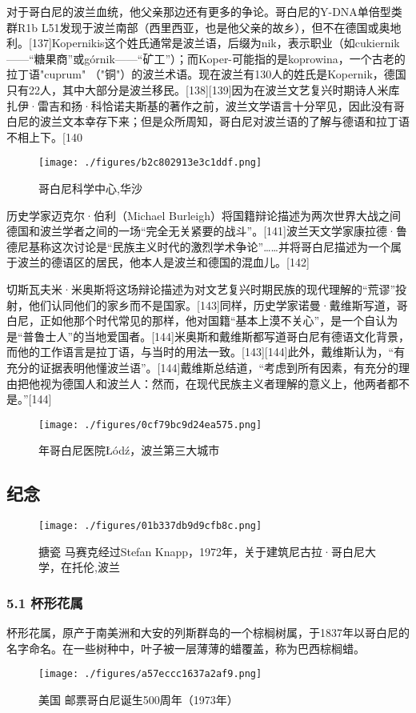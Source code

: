 对于哥白尼的波兰血统，他父亲那边还有更多的争论。哥白尼的Y-DNA单倍型类群R1b L51发现于波兰南部（西里西亚，也是他父亲的故乡），但不在德国或奥地利。[137]Kopernikis这个姓氏通常是波兰语，后缀为nik，表示职业（如cukiernik——“糖果商”或górnik——“矿工”）；而Koper-可能指的是koprowina，一个古老的拉丁语"cuprum" （"铜"）的波兰术语。现在波兰有130人的姓氏是Kopernik，德国只有22人，其中大部分是波兰移民。[138][139]因为在波兰文艺复兴时期诗人米库扎伊·雷吉和扬·科恰诺夫斯基的著作之前，波兰文学语言十分罕见，因此没有哥白尼的波兰文本幸存下来；但是众所周知，哥白尼对波兰语的了解与德语和拉丁语不相上下。[140
\begin{figure}[ht]
\centering
\texttt{[image: ./figures/b2c802913e3c1ddf.png]}
\caption{哥白尼科学中心,华沙} \label{fig_GBN_31}
\end{figure}
历史学家迈克尔·伯利（Michael Burleigh）将国籍辩论描述为两次世界大战之间德国和波兰学者之间的一场“完全无关紧要的战斗”。[141]波兰天文学家康拉德·鲁德尼基称这次讨论是“民族主义时代的激烈学术争论”……并将哥白尼描述为一个属于波兰的德语区的居民，他本人是波兰和德国的混血儿。[142]

切斯瓦夫米·米奥斯将这场辩论描述为对文艺复兴时期民族的现代理解的“荒谬”投射，他们认同他们的家乡而不是国家。[143]同样，历史学家诺曼·戴维斯写道，哥白尼，正如他那个时代常见的那样，他对国籍“基本上漠不关心”，是一个自认为是“普鲁士人”的当地爱国者。[144]米奥斯和戴维斯都写道哥白尼有德语文化背景，而他的工作语言是拉丁语，与当时的用法一致。[143][144]此外，戴维斯认为，“有充分的证据表明他懂波兰语”。[144]戴维斯总结道，“考虑到所有因素，有充分的理由把他视为德国人和波兰人：然而，在现代民族主义者理解的意义上，他两者都不是。”[144]
\begin{figure}[ht]
\centering
\texttt{[image: ./figures/0cf79bc9d24ea575.png]}
\caption{年哥白尼医院Łódź，波兰第三大城市} \label{fig_GBN_32}
\end{figure}

\subsection{纪念}
\begin{figure}[ht]
\centering
\texttt{[image: ./figures/01b337db9d9cfb8c.png]}
\caption{搪瓷 马赛克经过Stefan Knapp，1972年，关于建筑尼古拉·哥白尼大学，在托伦,波兰} \label{fig_GBN_34}
\end{figure}

\subsubsection{5.1 杯形花属}
杯形花属，原产于南美洲和大安的列斯群岛的一个棕榈树属，于1837年以哥白尼的名字命名。在一些树种中，叶子被一层薄薄的蜡覆盖，称为巴西棕榈蜡。
\begin{figure}[ht]
\centering
\texttt{[image: ./figures/a57eccc1637a2af9.png]}
\caption{美国 邮票哥白尼诞生500周年（1973年）} \label{fig_GBN_35}
\end{figure}

